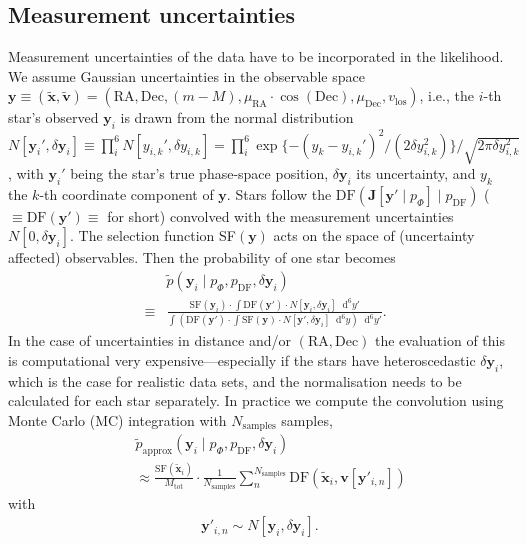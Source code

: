 \documentclass[iop,revtex4,numberedappendix,appendixfloats]{emulateapj}
\newcommand{\vect}[1]{\boldsymbol{#1}}
\newcommand*\Diff[1]{\mathop{}\!\mathrm{d^#1}}
\begin{document}
\subsection{Measurement uncertainties}

Measurement uncertainties of the data have to be incorporated in the likelihood. We assume Gaussian uncertainties in the observable space $\vect{y} \equiv (\tilde{\vect{x}},\tilde{\vect{v}})=(\text{RA},\text{Dec},(m-M),\mu_\text{RA} \cdot \cos (\text{Dec}),\mu_\text{Dec},v_\text{los})$, i.e., the $i$-th star's observed $\vect{y}_i$ is drawn from the normal distribution $N[{\vect{y}_i}',\delta \vect{y}_i] \equiv \prod_i^6 N[{y_{i,k}}',\delta y_{i,k}] = \prod_i^6 \exp \{-(y_{k}-{y_{i,k}}')^2/ (2 \delta y_{i,k}^2) \} / \sqrt{2 \pi \delta y_{i,k}^2}$, with ${\vect{y}_i}'$ being the star's true phase-space position, $\delta \vect{y}_i$ its uncertainty, and $y_k$ the $k$-th coordinate component of $\vect{y}$. Stars follow the $\text{DF}(\vect{J}[\vect{y}' \mid p_\Phi] \mid p_\text{DF})$ ($\equiv \text{DF}(\vect{y}') \equiv$ for short) convolved with the measurement uncertainties $N[0,\delta \vect{y}_i]$. The selection function SF$(\vect{y})$ acts on the space of (uncertainty affected) observables. Then the probability of one star becomes
\begin{eqnarray}
&&\tilde{p}(\vect{y}_i \mid p_\Phi,p_\text{DF},\delta \vect{y}_i)\nonumber\\
& \equiv& \frac{\text{SF}(\vect{y}_i) \cdot \int \text{DF}(\vect{y}') \cdot N[\vect{y}_i,\delta \vect{y}_i] \Diff{6} y'}{\int \left( \text{DF}(\vect{y}') \cdot \int \text{SF}(\vect{y}) \cdot N[\vect{y}',\delta \vect{y}_i] \Diff{6} y \right) \Diff{6}y'}.
\end{eqnarray}
In the case of uncertainties in distance and/or $(\text{RA},\text{Dec})$ the evaluation of this is computational very expensive---especially if the stars have heteroscedastic $\delta \vect{y}_i$, which is the case for realistic data sets, and the normalisation needs to be calculated for each star separately. In practice we compute the convolution using Monte Carlo (MC) integration with $N_\text{samples}$ samples,
\begin{eqnarray}
&&\tilde{p}_\text{approx}(\vect{y}_i \mid p_\Phi,p_\text{DF},\delta \vect{y}_i) \nonumber\\
&&\approx \frac{ \text{SF}(\tilde{\vect{x}}_i)}{M_\text{tot}} \cdot \frac{1}{N_\text{samples}} \sum_n^{N_\text{samples}} \text{DF}(\tilde{\vect{x}}_i,\vect{v}[\vect{y}'_{i,n}]) \label{eq:errorconv}
\end{eqnarray}
with
\begin{eqnarray}
\vect{y}'_{i,n} \sim N[\vect{y}_i,\delta \vect{y}_i].\nonumber
\end{eqnarray}
\end{document}
